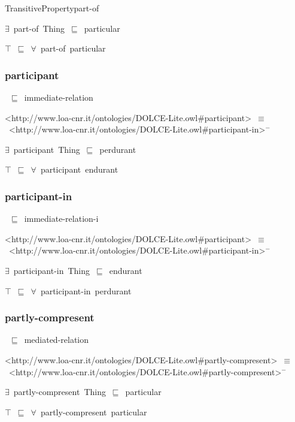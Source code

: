 \documentclass{article}
\begin{document}
TransitivePropertypart-of

\ensuremath{\exists}~part-of~Thing~\ensuremath{\sqsubseteq}~particular

\ensuremath{\top}~\ensuremath{\sqsubseteq}~\ensuremath{\forall}~part-of~particular

\subsubsection*{participant}

~\ensuremath{\sqsubseteq}~immediate-relation

<http://www.loa-cnr.it/ontologies/DOLCE-Lite.owl#participant>~\ensuremath{\equiv}~<http://www.loa-cnr.it/ontologies/DOLCE-Lite.owl#participant-in>\ensuremath{^-}

\ensuremath{\exists}~participant~Thing~\ensuremath{\sqsubseteq}~perdurant

\ensuremath{\top}~\ensuremath{\sqsubseteq}~\ensuremath{\forall}~participant~endurant

\subsubsection*{participant-in}

~\ensuremath{\sqsubseteq}~immediate-relation-i

<http://www.loa-cnr.it/ontologies/DOLCE-Lite.owl#participant>~\ensuremath{\equiv}~<http://www.loa-cnr.it/ontologies/DOLCE-Lite.owl#participant-in>\ensuremath{^-}

\ensuremath{\exists}~participant-in~Thing~\ensuremath{\sqsubseteq}~endurant

\ensuremath{\top}~\ensuremath{\sqsubseteq}~\ensuremath{\forall}~participant-in~perdurant

\subsubsection*{partly-compresent}

~\ensuremath{\sqsubseteq}~mediated-relation

<http://www.loa-cnr.it/ontologies/DOLCE-Lite.owl#partly-compresent>~\ensuremath{\equiv}~<http://www.loa-cnr.it/ontologies/DOLCE-Lite.owl#partly-compresent>\ensuremath{^-}

\ensuremath{\exists}~partly-compresent~Thing~\ensuremath{\sqsubseteq}~particular

\ensuremath{\top}~\ensuremath{\sqsubseteq}~\ensuremath{\forall}~partly-compresent~particular
\end{document}
